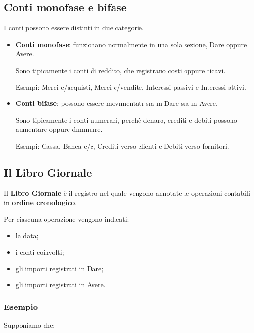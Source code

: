 \subsection{Conti monofase e bifase}

\noindent I conti possono essere distinti in due categorie.

\begin{itemize}
    \item \textbf{Conti monofase}: funzionano normalmente
    in una sola sezione, Dare oppure Avere.

    \noindent Sono tipicamente i conti di reddito,
    che registrano costi oppure ricavi.

    \noindent Esempi: Merci c/acquisti, Merci c/vendite,
    Interessi passivi e Interessi attivi.

    \item \textbf{Conti bifase}: possono essere movimentati
    sia in Dare sia in Avere.

    \noindent Sono tipicamente i conti numerari,
    perché denaro, crediti e debiti possono
    aumentare oppure diminuire.

    \noindent Esempi: Cassa, Banca c/c,
    Crediti verso clienti e Debiti verso fornitori.
\end{itemize}


\subsection{Il Libro Giornale}

\noindent Il \textbf{Libro Giornale} è il registro nel quale
vengono annotate le operazioni contabili
in \textbf{ordine cronologico}.

\medskip

\noindent Per ciascuna operazione vengono indicati:

\begin{itemize}
    \item la data;
    \item i conti coinvolti;
    \item gli importi registrati in Dare;
    \item gli importi registrati in Avere.
\end{itemize}

\subsubsection*{Esempio}

\noindent Supponiamo che:

